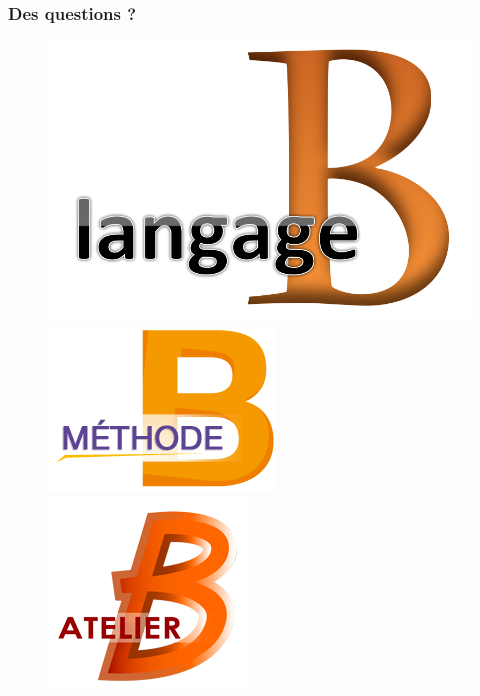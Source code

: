 \documentclass[11pt,a4paper,xcolor=table, handout]{beamer} %
\begin{document}
\begin{frame}
\frametitle{Des questions ?}
\begin{figure}[h]
\centering
\includegraphics[scale=0.07]{ressources/logo2.png}
\hspace{1em}
\includegraphics[scale=0.22]{ressources/logo1.png}
\hspace{1em}
\includegraphics[scale=0.22]{ressources/logo.png}
\hspace{1em}
\fontsize{100}{0} \selectfont {?}
\end{figure}
\end{frame}
\end{document}
